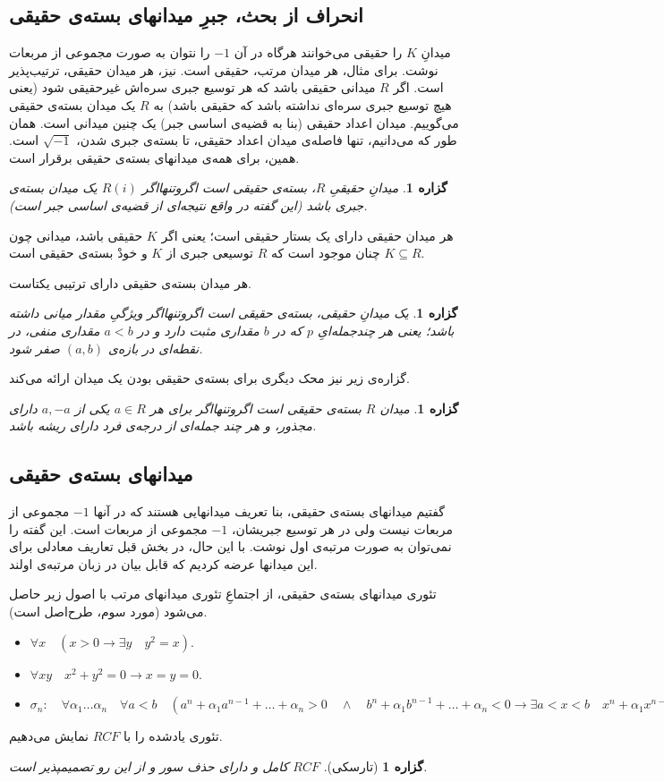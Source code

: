 \documentclass[12pt,a4paper]{article}
\theoremstyle{colorhead}
\newtheorem{prop}[thm]{گزاره}
\begin{document}
\subsection{	انحراف از بحث، جبرِ میدانهای بسته‌ی حقیقی}
میدانِ
$K$
را حقیقی می‌خوانند هرگاه در آن
$-1$
را نتوان به صورت مجموعی از مربعات نوشت. برای مثال، هر میدان مرتب، حقیقی است.
نیز، هر میدان حقیقی، ترتیب‌پذیر است. 
 اگر
$R$
میدانی حقیقی باشد که هر توسیع جبری سره‌اش غیرحقیقی شود
(یعنی هیچ توسیع‌ جبری‌ سره‌ای نداشته باشد که حقیقی باشد)
به
$R$
یک میدان بسته‌ی حقیقی می‌گوییم. میدان اعداد حقیقی 
(بنا به قضیه‌ی اساسی جبر)
 یک چنین میدانی است.
همان طور که می‌دانیم، تنها فاصله‌ی میدان اعداد حقیقی، تا بسته‌ی جبری شدن، 
$\sqrt{-1}$
است. همین، برای همه‌ی میدانهای بسته‌ی حقیقی برقرار است.
\begin{prop}
میدانِ حقیقیِ
$R$،
بسته‌ی حقیقی است اگروتنهااگر
$R(i)$
یک میدان بسته‌ی جبری باشد (این گفته در واقع نتیجه‌ای از قضیه‌ی اساسی جبر است).
\end{prop}
\par
هر میدان حقیقی دارای یک بستار حقیقی است؛‌ یعنی اگر
$K$
حقیقی باشد، میدانی چون
$K\subseteq R$
چنان موجود است که 
$R$
توسیعی جبری از
$K$
و خودْ بسته‌ی حقیقی است. 
\par 
هر میدان بسته‌ی حقیقی دارای ترتیبی یکتاست.  
\begin{prop}
یک میدانِ حقیقی، بسته‌ی حقیقی است اگروتنهااگر ویژگیِ مقدار میانی داشته باشد؛ یعنی هر چندجمله‌ایِ
$p$
که در 
$b$
مقداری مثبت دارد و در
$a<b$
مقداری منفی، در نقطه‌ای در بازه‌ی
$(a,b)$
صفر شود.
\end{prop}
گزاره‌ی زیر نیز محک دیگری برای بسته‌ی حقیقی بودن یک میدان ارائه می‌کند.
\begin{prop}
میدان
$R$
بسته‌ی حقیقی است اگروتنهااگر برای
هر
$a\in R$
یکی از
$a,-a$
دارای مجذور، و هر چند جمله‌ای از درجه‌ی فرد دارای ریشه باشد.
\end{prop}
\subsection{میدانهای بسته‌ی حقیقی}
گفتیم میدانهای بسته‌ی حقیقی، بنا تعریف میدانهایی هستند که در آنها
$-1$
مجموعی از مربعات نیست 
ولی در هر توسیع جبریشان،
$-1$
مجموعی از مربعات است. این گفته را نمی‌توان به صورت مرتبه‌ی اول نوشت. با این حال، در بخش قبل تعاریف معادلی برای این میدانها عرضه کردیم که قابل
بیان در زبان مرتبه‌ی اولند.
\par 
تئوری میدانهای بسته‌ی حقیقی، از اجتماعِ تئوری میدانهای مرتب با اصول زیر حاصل می‌شود (مورد سوم، طرح‌اصل است).
\begin{itemize}
\item 
$\forall x\quad (x>0\to \exists y \quad y^2=x)$.
\item 
$\forall xy \quad x^2+y^2=0\to x=y=0$.
\item 
$\sigma_n:\quad \forall \alpha_1\ldots \alpha_n \quad \forall a<b
\quad (a^n+\alpha_1a^{n-1}+\ldots+\alpha_n>0 \quad \wedge \quad
b^n+\alpha_1b^{n-1}+\ldots+\alpha_n<0\to 
\exists a<x<b\quad x^n+\alpha_1x^{n-1}+\ldots +\alpha_n=0)$
\end{itemize}
تئوری یادشده را با
$RCF$
نمایش می‌دهیم.
\begin{prop}[تارسکی]
$RCF$
کامل و دارای حذف سور و از این رو تصمیمپذیر است.
\end{prop}
\end{document}
